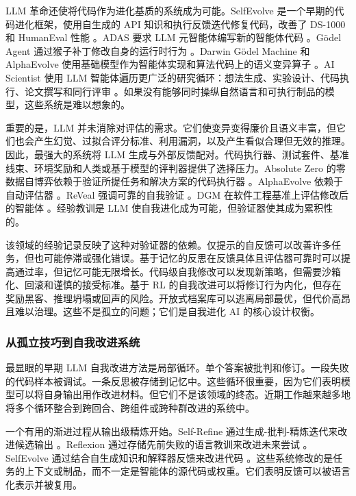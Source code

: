 LLM 革命还使将代码作为进化基质的系统成为可能。SelfEvolve 是一个早期的代码进化框架，使用自生成的 API 知识和执行反馈迭代修复代码，改善了 DS-1000 和 HumanEval 性能 \cite{selfevolve2023}。ADAS 要求 LLM 元智能体编写新的智能体代码 \cite{adas2025}。G{\"o}del Agent 通过猴子补丁修改自身的运行时行为 \cite{yin2024godel}。Darwin G{\"o}del Machine 和 AlphaEvolve 使用基础模型作为智能体实现和算法代码上的语义变异算子 \cite{darwingodelmachine2025,alphaevolve2025}。AI Scientist 使用 LLM 智能体遍历更广泛的研究循环：想法生成、实验设计、代码执行、论文撰写和同行评审 \cite{aiscientist2024}。如果没有能够同时操纵自然语言和可执行制品的模型，这些系统是难以想象的。

重要的是，LLM 并未消除对评估的需求。它们使变异变得廉价且语义丰富，但它们也会产生幻觉、过拟合评分标准、利用漏洞，以及产生看似合理但无效的推理。因此，最强大的系统将 LLM 生成与外部反馈配对。代码执行器、测试套件、基准线束、环境奖励和人类或基于模型的评判器提供了选择压力。Absolute Zero 的零数据自博弈依赖于验证所提任务和解决方案的代码执行器 \cite{absolutezero2025}。AlphaEvolve 依赖于自动评估器 \cite{alphaevolve2025}。ReVeal 强调可靠的自我验证 \cite{reveal2025}。DGM 在软件工程基准上评估修改后的智能体 \cite{darwingodelmachine2025}。经验教训是 LLM 使自我进化成为可能，但验证器使其成为累积性的。

该领域的经验记录反映了这种对验证器的依赖。仅提示的自反馈可以改善许多任务，但也可能停滞或强化错误。基于记忆的反思在反馈具体且评估器可靠时可以提高通过率，但记忆可能无限增长。代码级自我修改可以发现新策略，但需要沙箱化、回滚和谨慎的接受标准。基于 RL 的自我改进可以将修订行为内化，但存在奖励黑客、推理坍塌或回声的风险。开放式档案库可以逃离局部最优，但代价高昂且难以治理。这些不是孤立的问题；它们是自我进化 AI 的核心设计权衡。

\subsubsection{从孤立技巧到自我改进系统}

最显眼的早期 LLM 自我改进方法是局部循环。单个答案被批判和修订。一段失败的代码样本被调试。一条反思被存储到记忆中。这些循环很重要，因为它们表明模型可以将自身输出用作改进材料。但它们不是该领域的终态。近期工作越来越多地将多个循环整合到跨回合、跨组件或跨种群改进的系统中。

一个有用的渐进过程从输出级精炼开始。Self-Refine 通过生成-批判-精炼迭代来改进候选输出 \cite{selfrefine2023}。Reflexion 通过存储先前失败的语言教训来改进未来尝试 \cite{reflexion2023}。SelfEvolve 通过结合自生成知识和解释器反馈来改进代码 \cite{selfevolve2023}。这些系统修改的是任务的上下文或制品，而不一定是智能体的源代码或权重。它们表明反馈可以被语言化表示并被复用。

